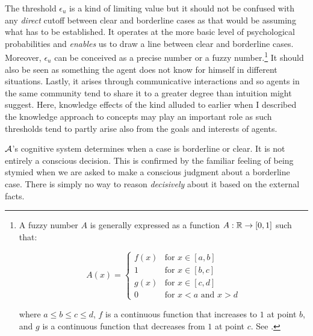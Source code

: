 
The threshold $\epsilon_u$ is a kind of limiting value but it should not be confused with any \emph{direct} cutoff between clear and borderline cases as that would be assuming what has to be established. It operates at the more basic level of psychological probabilities and \emph{enables} us to draw a line between clear and borderline cases. Moreover, $\epsilon_u$ can be conceived as a precise number or a fuzzy number.\footnote{A fuzzy number $A$ is generally expressed as a function $A: \mathbb{R} \rightarrow [0,1]$ such that:

\[ A(x) = \left\{ \begin{array}{ll}
f(x) & \mbox{for $x \in [a,b]$} \\
1 & \mbox{for $x \in [b,c]$} \\
g(x) & \mbox{for $x \in [c,d]$} \\
0 & \mbox{for $x < a$ and $x > d$}
\end{array}
\right. \]

\noindent where $a \leq b \leq c \leq d$, $f$ is a continuous function that increases to $1$ at point $b$, and $g$ is a continuous function that decreases from $1$ at point $c$. See \citet[170]{ksy:fst}.} It should also be seen as something the agent does not know for himself in different situations. Lastly, it arises through communicative interactions and so agents in the same community tend to share it to a greater degree than intuition might suggest. Here, knowledge effects of the kind alluded to earlier when I described the knowledge approach to concepts may play an important role as such thresholds tend to partly arise also from the goals and interests of agents. 

$\cal A$'s cognitive system determines when a case is borderline or clear. It is not entirely a conscious decision. This is confirmed by the familiar feeling of being stymied when we are asked to make a conscious judgment about a borderline case. There is simply no way to reason \emph{decisively} about it based on the external facts. 



